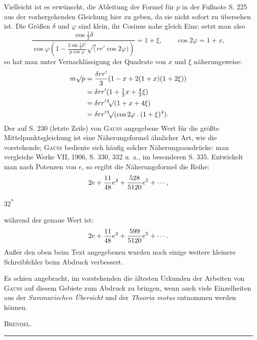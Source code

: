 Vielleicht ist es erwünscht, die Ableitung der Formel für $p$ in der Fußnote S. 225 aus der vorhergehenden Gleichung hier zu geben, da sie nicht sofort zu übersehen ist. Die Größen $\delta$ und $\varphi$ sind klein, ihr Cosinus nahe gleich Eins; setzt man also
\[
\frac{\cos\frac12\delta}{\cos\varphi\left(1-\frac{2\sin\frac14\delta^2}{p\cos\varphi}\surd(rr'\cos2\varphi)\right)}=1+\xi,
\qquad\cos2\varphi=1+x,
\]
\noindent so hat man unter Vernachlässigung der Quadrate von $x$ und $\xi$ näherungsweise:
\[
\begin{aligned}
m\surd p&=\frac{\delta rr'}3(1-x+2(1+x)(1+2\xi))\\
&=\delta rr'(1+\tfrac13x+\tfrac43\xi)\\
&=\delta rr'\mathord{{}^{3}\!\surd}(1+x+4\xi)\\
&=\delta rr'\mathord{{}^{3}\!\surd}(\cos2\varphi\mathbin{.}(1+\xi)^4).
\end{aligned}
\]
\noindent\hspace*{\parindent}Der auf S. 230 (letzte Zeile) von \textsc{Gauss} angegebene Wert für die größte Mittelpunktsgleichung ist eine Näherungsformel ähnlicher Art, wie die vorstehende; \textsc{Gauss} bediente sich häufig solcher Näherungsausdrücke: man vergleiche Werke VII, 1906, S. 330, 332 u. a., im besonderen S. 335. Entwickelt man nach Potenzen von $e$, so ergibt die Näherungsformel die Reihe:
\[
2e+\frac{11}{48}e^3+\frac{528}{5120}e^5+\mathinner{\cdotp\cdotp\cdotp},
\]
\begin{flushright}32\textsuperscript{*}\end{flushright}
\clearpage
{}
\noindent während der genaue Wert ist:
\[
2e+\frac{11}{48}e^3+\frac{599}{5120}e^5+\mathinner{\cdotp\cdotp\cdotp}.
\]
\noindent\hspace*{\parindent}Außer den oben beim Text angegebenen wurden noch einige weitere kleinere Schreibfehler beim Abdruck verbessert.

Es schien angebracht, im vorstehenden die ältesten Urkunden der Arbeiten von \textsc{Gauss} auf diesem Gebiete zum Abdruck zu bringen, wenn auch viele Einzelheiten aus der \textit{Summarischen Übersicht} und der \textit{Theoria motus} entnommen werden können.
\begin{flushright}\textsc{Brendel}.\end{flushright}
\begin{center}\rule{.24\linewidth}{.3pt}\end{center}
\clearpage
\endgroup
